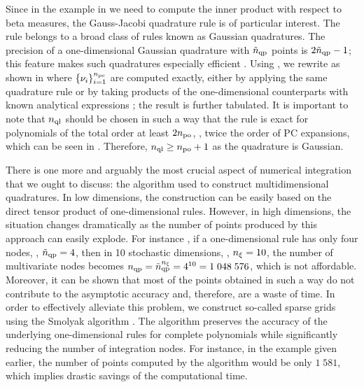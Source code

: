 Since in the example in  we need to compute the inner product with respect to beta measures, the Gauss-Jacobi quadrature rule is of particular interest.
The rule belongs to a broad class of rules known as Gaussian quadratures.
The precision of a one-dimensional Gaussian quadrature with ${\tilde{n}_\text{qp}}$ points is $2 {\tilde{n}_\text{qp}} - 1$; this feature makes such quadratures especially efficient \cite{heiss2008}.
Using , we rewrite  as shown in  where $\{ \nu_i \}_{i = 1}^{{n_\text{pc}}}$ are computed exactly, either by applying the same quadrature rule or by taking products of the one-dimensional counterparts with known analytical expressions \cite{xiu2010}; the result is further tabulated.
It is important to note that ${n_\text{ql}}$ should be chosen in such a way that the rule is exact for polynomials of the total order at least $2 {n_\text{po}}$, \ie, twice the order of PC expansions, which can be seen in  \cite{eldred2008}.
Therefore, ${n_\text{ql}} \geq {n_\text{po}} + 1$ as the quadrature is Gaussian.

There is one more and arguably the most crucial aspect of numerical integration that we ought to discuss: the algorithm used to construct multidimensional quadratures.
In low dimensions, the construction can be easily based on the direct tensor product of one-dimensional rules.
However, in high dimensions, the situation changes dramatically as the number of points produced by this approach can easily explode.
For instance \cite{heiss2008}, if a one-dimensional rule has only four nodes, \ie, ${\tilde{n}_\text{qp}} = 4$, then in 10 stochastic dimensions, \ie, ${n_\xi} = 10$, the number of multivariate nodes becomes ${n_\text{qp}} = {\tilde{n}_\text{qp}}^{n_\xi} = 4^{10} = 1\;048\;576$, which is not affordable.
Moreover, it can be shown that most of the points obtained in such a way do not contribute to the asymptotic accuracy and, therefore, are a waste of time.
In order to effectively alleviate this problem, we construct so-called sparse grids using the Smolyak algorithm \cite{eldred2008, heiss2008, burkardt2013}.
The algorithm preserves the accuracy of the underlying one-dimensional rules for complete polynomials while significantly reducing the number of integration nodes.
For instance, in the example given earlier, the number of points computed by the algorithm would be only $1\;581$, which implies drastic savings of the computational time.
